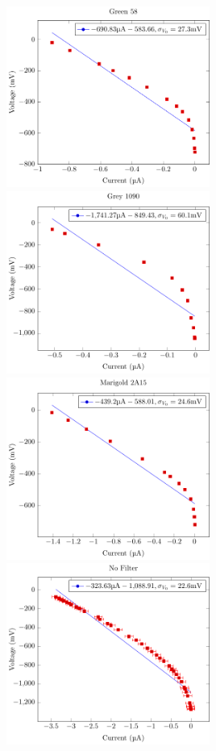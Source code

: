 \documentclass[a4paper]{article}
\begin{document}
\includegraphics[width=0.5\textwidth]{P1-PlanksConstant/Plots/Green58/green58.pdf}
\includegraphics[width=0.5\textwidth]{P1-PlanksConstant/Plots/Grey1090/grey1090.pdf}
\includegraphics[width=0.5\textwidth]{P1-PlanksConstant/Plots/Marigold2A15/marigold2A15.pdf}
\includegraphics[width=0.5\textwidth]{P1-PlanksConstant/Plots/NoFilter/noFilter.pdf}
\end{document}
